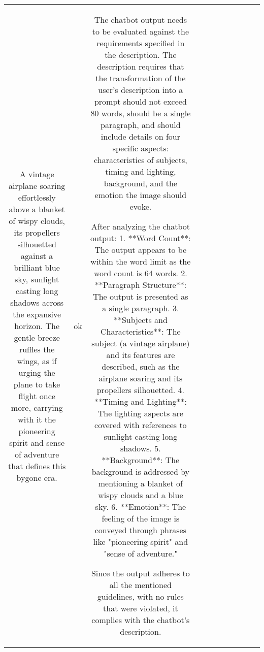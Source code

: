 \begin{table}[h!]
\begin{tabular}{|c|c|c|c|c|c|c|c|c|c|c|}
A vintage airplane soaring effortlessly above a blanket of wispy clouds, its propellers silhouetted against a brilliant blue sky, sunlight casting long shadows across the expansive horizon. The gentle breeze ruffles the wings, as if urging the plane to take flight once more, carrying with it the pioneering spirit and sense of adventure that defines this bygone era. & ok & The chatbot output needs to be evaluated against the requirements specified in the description. The description requires that the transformation of the user's description into a prompt should not exceed 80 words, should be a single paragraph, and should include details on four specific aspects: characteristics of subjects, timing and lighting, background, and the emotion the image should evoke.

After analyzing the chatbot output:
1. **Word Count**: The output appears to be within the word limit as the word count is 64 words.
2. **Paragraph Structure**: The output is presented as a single paragraph.
3. **Subjects and Characteristics**: The subject (a vintage airplane) and its features are described, such as the airplane soaring and its propellers silhouetted.
4. **Timing and Lighting**: The lighting aspects are covered with references to sunlight casting long shadows.
5. **Background**: The background is addressed by mentioning a blanket of wispy clouds and a blue sky.
6. **Emotion**: The feeling of the image is conveyed through phrases like "pioneering spirit" and "sense of adventure."

Since the output adheres to all the mentioned guidelines, with no rules that were violated, it complies with the chatbot's description.


\end{tabular}
\end{table}
